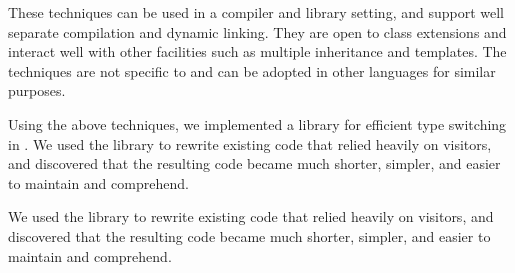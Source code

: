 These techniques can be used in a compiler and library setting, and support well 
separate compilation and dynamic linking. They are open to class extensions and 
interact well with other \Cpp{} facilities such as multiple inheritance and 
templates. The techniques are not specific to \Cpp{} and can be adopted in other 
languages for similar purposes.

Using the above techniques, we implemented a library for efficient type switching 
in \Cpp{}. We used the library to rewrite existing code that relied heavily on 
visitors, and discovered that the resulting code became much shorter, simpler, 
and easier to maintain and comprehend.

We used the library to rewrite existing code that relied heavily on 
visitors, and discovered that the resulting code became much shorter, simpler, and easier 
to maintain and comprehend.
